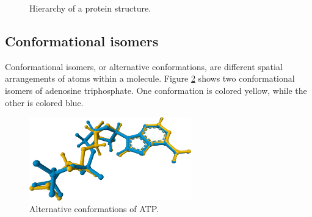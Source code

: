 \documentclass[
  digital,     %
  oneside,     %
  nosansbold,  %
  nocolorbold, %
  lof,         %
  lot,         %
]{fithesis4}
\begin{document}
\begin{figure}[htbp]
  \centering
  \caption{Hierarchy of a protein structure.}
  \label{fig:structure}
\end{figure}

\subsection{Conformational isomers}
\label{section:alternative_conformations}

Conformational isomers, or alternative conformations, are different spatial arrangements of atoms within a molecule. \cite{conformational_isomerism} Figure \ref{fig:alternative_conformations} shows two conformational isomers of adenosine triphosphate. One conformation is colored yellow, while the other is colored blue.

\begin{figure}[htbp]
  \begin{center}
    \includegraphics[width=7cm]{figures/alt_conformations.png}
  \end{center}
  \caption{Alternative conformations of ATP.}
  \label{fig:alternative_conformations}
\end{figure}
\end{document}
